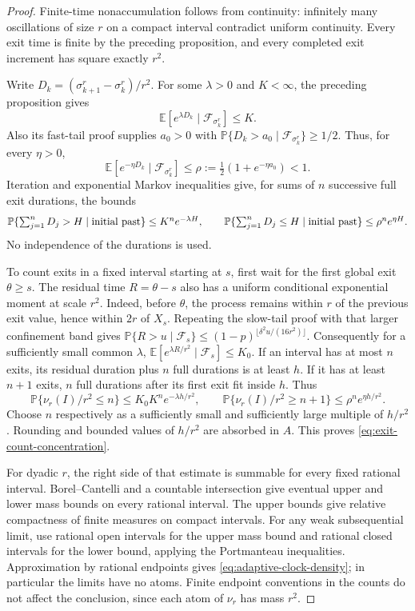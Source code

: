 \documentclass[11pt]{article}
\theoremstyle{definition}\newtheorem{definition}[theorem]{Definition}
\theoremstyle{remark}\newtheorem{remark}[theorem]{Remark}
\begin{document}
\begin{proof}
Finite-time nonaccumulation follows from continuity: infinitely many
oscillations of size $r$ on a compact interval contradict uniform
continuity. Every exit time is finite by the preceding proposition,
and every completed exit increment has square exactly $r^2$.

Write $D_k=(\sigma^r_{k+1}-\sigma^r_k)/r^2$.
For some $\lambda>0$ and $K<\infty$, the preceding proposition gives
\[
 \mathbb E[e^{\lambda D_k}\mid\mathcal F_{\sigma^r_k}]\le K.
 \label{eq:exit-positive-laplace}
\]
Also its fast-tail proof supplies $a_0>0$ with
$\mathbb P\{D_k>a_0\mid\mathcal F_{\sigma^r_k}\}\ge1/2$.
Thus, for every $\eta>0$,
\[
 \mathbb E[e^{-\eta D_k}\mid\mathcal F_{\sigma^r_k}]
 \le\rho:=\tfrac12(1+e^{-\eta a_0})<1.
 \label{eq:exit-negative-laplace}
\]
Iteration and exponential Markov inequalities give, for sums of $n$
successive full exit durations, the bounds
\[
 \mathbb P\{\textstyle\sum_{j=1}^nD_j>H\mid\hbox{initial past}\}
       \le K^ne^{-\lambda H},\qquad
 \mathbb P\{\textstyle\sum_{j=1}^nD_j\le H\mid\hbox{initial past}\}
       \le\rho^ne^{\eta H}.
 \label{eq:exit-renewal-bounds}
\]
No independence of the durations is used.

To count exits in a fixed interval starting at $s$, first wait for the
first global exit $\theta\ge s$. The residual time $R=\theta-s$
also has a uniform conditional exponential moment at scale $r^2$.
Indeed, before $\theta$, the process remains within $r$ of the previous
exit value, hence within $2r$ of $X_s$. Repeating the slow-tail proof
with that larger confinement band gives
$\mathbb P\{R>u\mid\mathcal F_s\}\le
 (1-p)^{\lfloor\delta^2u/(16r^2)\rfloor}$.
Consequently for a sufficiently small common $\lambda$,
$\mathbb E[e^{\lambda R/r^2}\mid\mathcal F_s]\le K_0$.
If an interval has at most $n$ exits, its residual duration plus $n$
full durations is at least $h$. If it has at least $n+1$ exits, $n$ full
durations after its first exit fit inside $h$. Thus
\[
 \mathbb P\{\nu_r(I)/r^2\le n\}\le K_0K^ne^{-\lambda h/r^2},
 \qquad
 \mathbb P\{\nu_r(I)/r^2\ge n+1\}\le\rho^ne^{\eta h/r^2}.
\]
Choose $n$ respectively as a sufficiently small and sufficiently large
multiple of $h/r^2$. Rounding and bounded values of $h/r^2$ are absorbed
in $A$. This proves \eqref{eq:exit-count-concentration}.

For dyadic $r$, the right side of that estimate is summable for every
fixed rational interval. Borel--Cantelli and a countable intersection
give eventual upper and lower mass bounds on every rational interval.
The upper bounds give relative compactness of finite measures on compact
intervals. For any weak subsequential limit, use rational open intervals
for the upper mass bound and rational closed intervals for the lower
bound, applying the Portmanteau inequalities. Approximation by rational
endpoints gives \eqref{eq:adaptive-clock-density}; in particular the
limits have no atoms. Finite endpoint conventions in the counts do not
affect the conclusion, since each atom of $\nu_r$ has mass $r^2$.
\end{proof}
\end{document}
